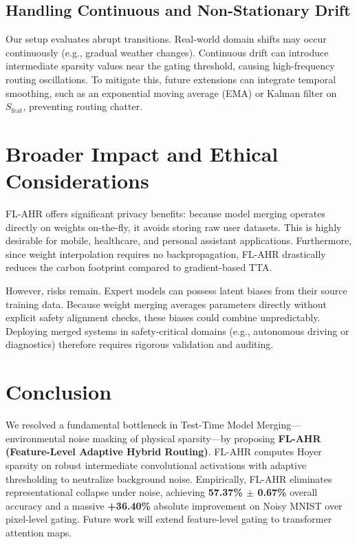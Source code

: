 \documentclass{article}
\theoremstyle{plain}
\theoremstyle{definition}
\theoremstyle{remark}
\begin{document}
\subsection{Handling Continuous and Non-Stationary Drift}
Our setup evaluates abrupt transitions. Real-world domain shifts may occur continuously (e.g., gradual weather changes). Continuous drift can introduce intermediate sparsity values near the gating threshold, causing high-frequency routing oscillations. To mitigate this, future extensions can integrate temporal smoothing, such as an exponential moving average (EMA) or Kalman filter on $S_{\text{feat}}$, preventing routing chatter.

\section{Broader Impact and Ethical Considerations}
FL-AHR offers significant privacy benefits: because model merging operates directly on weights on-the-fly, it avoids storing raw user datasets. This is highly desirable for mobile, healthcare, and personal assistant applications. Furthermore, since weight interpolation requires no backpropagation, FL-AHR drastically reduces the carbon footprint compared to gradient-based TTA.

However, risks remain. Expert models can possess latent biases from their source training data. Because weight merging averages parameters directly without explicit safety alignment checks, these biases could combine unpredictably. Deploying merged systems in safety-critical domains (e.g., autonomous driving or diagnostics) therefore requires rigorous validation and auditing.

\section{Conclusion}
\label{submission-conclusion}
We resolved a fundamental bottleneck in Test-Time Model Merging---environmental noise masking of physical sparsity---by proposing \textbf{FL-AHR (Feature-Level Adaptive Hybrid Routing)}. FL-AHR computes Hoyer sparsity on robust intermediate convolutional activations with adaptive thresholding to neutralize background noise. Empirically, FL-AHR eliminates representational collapse under noise, achieving \textbf{57.37\% $\pm$ 0.67\%} overall accuracy and a massive \textbf{+36.40\%} absolute improvement on Noisy MNIST over pixel-level gating. Future work will extend feature-level gating to transformer attention maps.

\clearpage


\end{document}
